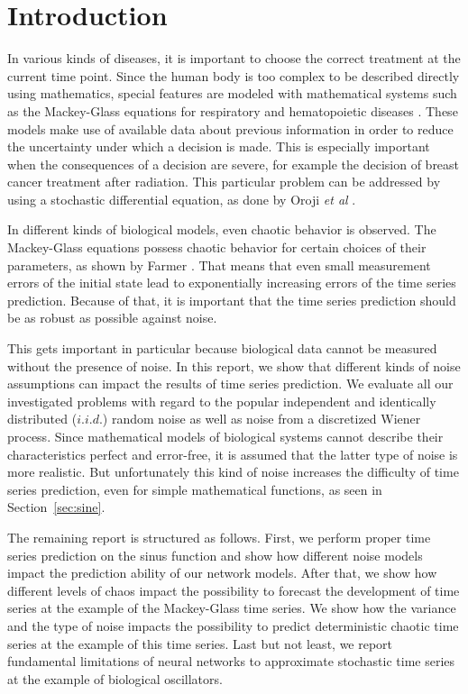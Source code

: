 \section{Introduction}

In various kinds of diseases, it is important to choose the correct treatment at
the current time point. Since the human body is too complex to be described
directly using mathematics, special features are modeled with mathematical
systems such as the Mackey-Glass equations for respiratory and hematopoietic
diseases \cite{mackey1977}. These models make use of available data about
previous information in order to reduce the uncertainty under which a decision
is made. This is especially important when the consequences of a decision are
severe, for example the decision of breast cancer treatment after radiation.
This particular problem can be addressed by using a stochastic differential
equation, as done by Oroji \textit{et al} \cite{oroji2016}.

In different kinds of biological models, even chaotic behavior is observed. The
Mackey-Glass equations possess chaotic behavior for certain choices of their
parameters, as shown by Farmer \cite{farmer1982}. That means that even small
measurement errors of the initial state lead to exponentially increasing
errors of the time series prediction. Because of that, it is important
that the time series prediction should be as robust as possible against noise.

This gets important in particular because biological data cannot be measured 
without the presence of noise. In
this report, we show that different kinds of noise assumptions can impact the
results of time series prediction. We evaluate all our investigated problems
with regard to the popular independent and identically distributed ($i.i.d.$)
random noise as well as noise from a
discretized Wiener process.
Since mathematical models of biological systems cannot describe their
characteristics perfect and error-free, it is assumed that the latter type of
noise is more realistic. But unfortunately this kind of noise increases the
difficulty of time series prediction, even for simple mathematical functions,
as seen in Section~\ref{sec:sine}.

The remaining report is structured as follows. First, we perform proper time
series prediction on the sinus function and show how different noise models
impact the prediction ability of our network models. After that, we show how
different levels of chaos impact the possibility to forecast the development
of time series at the example of the Mackey-Glass time series. We show
how the variance and the type
of noise impacts the possibility to predict deterministic
chaotic time series at the example of this time series. Last
but not least, we report fundamental limitations of neural networks to
approximate stochastic time series at the example of biological oscillators.
